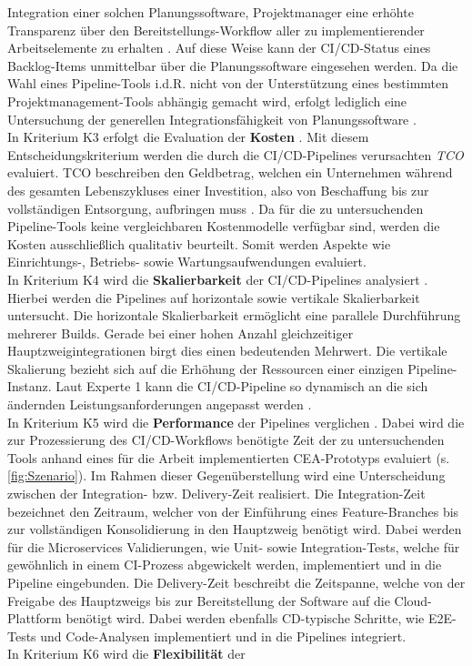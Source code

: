 Integration einer solchen Planungssoftware, Projektmanager eine erhöhte Transparenz über den Bereitstellungs-Workflow aller zu implementierender Arbeitselemente zu erhalten \cite[Z. 96 ff.]{TestDeveloperSAPHyperspaceAdoption&Onboarding.}. Auf diese Weise kann der CI/CD-Status eines Backlog-Items unmittelbar über die Planungssoftware eingesehen werden. Da die Wahl eines Pipeline-Tools i.d.R. nicht von der Unterstützung eines bestimmten Projektmanagement-Tools abhängig gemacht wird, erfolgt lediglich eine Untersuchung der generellen Integrationsfähigkeit von Planungssoftware \cite[Z. 96 ff.]{TestDeveloperSAPHyperspaceAdoption&Onboarding.}.\\In Kriterium K3 erfolgt die Evaluation der \textbf{Kosten} \cite[Z. 42 ff.]{ProductManagerSAPHyperspaceCICD.}. Mit diesem Entscheidungskriterium werden die durch die CI/CD-Pipelines verursachten \textit{\ac{TCO}} evaluiert. TCO beschreiben den Geldbetrag, welchen ein Unternehmen während des gesamten Lebenszykluses einer Investition, also von Beschaffung bis zur vollständigen Entsorgung, aufbringen muss \cite[4]{Ellram.1993}. Da für die zu untersuchenden Pipeline-Tools keine vergleichbaren Kostenmodelle verfügbar sind, werden die Kosten ausschließlich qualitativ beurteilt. Somit werden Aspekte wie Einrichtungs-, Betriebs- sowie Wartungsaufwendungen evaluiert. \\In Kriterium K4 wird die \textbf{Skalierbarkeit} der CI/CD-Pipelines analysiert \cite[Z. 69 ff.]{ProductOwnerSAPBTPProd&Infra.}. Hierbei werden die Pipelines auf horizontale sowie vertikale Skalierbarkeit untersucht. Die horizontale Skalierbarkeit ermöglicht eine parallele Durchführung mehrerer Builds. Gerade bei einer hohen Anzahl gleichzeitiger Hauptzweigintegrationen birgt dies einen bedeutenden Mehrwert. Die vertikale Skalierung bezieht sich auf die Erhöhung der Ressourcen einer einzigen Pipeline-Instanz. Laut Experte 1 kann die CI/CD-Pipeline so dynamisch an die sich ändernden Leistungsanforderungen angepasst werden \cite[Z. 74 ff.]{ProductOwnerSAPBTPProd&Infra.}. \\In Kriterium K5 wird die \textbf{Performance} der Pipelines verglichen \cite[Z. 35 ff.]{ProductManagerSAPHyperspaceCICD.}. Dabei wird die zur Prozessierung des CI/CD-Workflows benötigte Zeit der zu untersuchenden Tools anhand eines für die Arbeit implementierten CEA-Prototyps evaluiert (s. \ref{fig:Szenario}). Im Rahmen dieser Gegenüberstellung wird eine Unterscheidung zwischen der Integration- bzw. Delivery-Zeit realisiert. Die Integration-Zeit bezeichnet den Zeitraum, welcher von der Einführung eines Feature-Branches bis zur vollständigen Konsolidierung in den Hauptzweig benötigt wird. Dabei werden für die Microservices Validierungen, wie Unit- sowie Integration-Tests, welche für gewöhnlich in einem CI-Prozess abgewickelt werden, implementiert und in die Pipeline eingebunden. Die Delivery-Zeit beschreibt die Zeitspanne, welche von der Freigabe des Hauptzweigs bis zur Bereitstellung der Software auf die Cloud-Plattform benötigt wird. Dabei werden ebenfalls CD-typische Schritte, wie E2E-Tests und Code-Analysen implementiert und in die Pipelines integriert.\\ In Kriterium K6 wird die \textbf{Flexibilität} der 